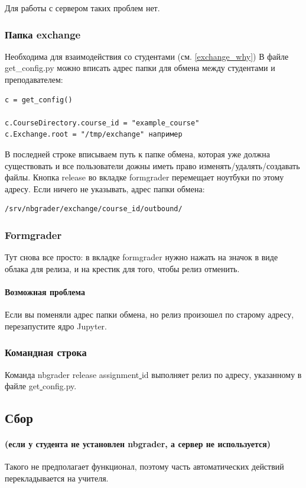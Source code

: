 \documentclass[a4paper,12pt]{article}
\begin{document}
Для работы с сервером таких проблем нет.

\subsubsection{Папка exchange}\label{exchange}

Необходима для взаимодействия со студентами (см. \ref{exchange_why})
В файле get\_config.py можно вписать адрес папки для обмена между студентами и преподавателем:
\begin{verbatim}
c = get_config()

c.CourseDirectory.course_id = "example_course"
c.Exchange.root = "/tmp/exchange" например
\end{verbatim}
В последней строке вписываем путь к папке обмена, которая уже должна существовать и все пользователи дожны иметь право изменять/удалять/создавать файлы.
Кнопка release во вкладке formgrader перемещает ноутбуки по этому адресу. Если ничего не указывать, адрес папки обмена:

\begin{verbatim} 
/srv/nbgrader/exchange/course_id/outbound/ 
\end{verbatim}

\subsubsection{Formgrader}

Тут снова все просто: в вкладке formgrader нужно нажать на значок в виде облака для релиза, и на крестик для того, чтобы релиз отменить. 
\paragraph{Возможная проблема}
Если вы поменяли адрес папки обмена, но релиз произошел по старому адресу, перезапустите ядро Jupyter.
\subsubsection{Командная строка}

Команда nbgrader release assignment\underline{ }id выполняет релиз по адресу, указанному в файле get\underline{ }config.py.
\subsection{Сбор}

\paragraph{(если у студента не установлен nbgrader, а сервер не используется)}
Такого не предполагает функционал, поэтому часть автоматических действий перекладывается на учителя.
\end{document}
